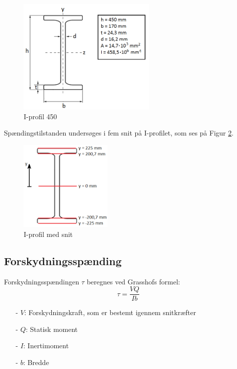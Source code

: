 \begin{figure}[H]
	\centering
	\includegraphics[width=0.6\textwidth]{billeder/iprofil.png}
	\caption{I-profil 450}
	\label{fig:iprofil}
\end{figure}

Spændingstilstanden undersøges i fem snit på I-profilet, som ses på Figur \ref{fig:iprofilsnit}.

\begin{figure}[H]
	\centering
	\includegraphics[width=0.4\textwidth]{billeder/iprofilsnit.png}
	\caption{I-profil med snit}
	\label{fig:iprofilsnit}
\end{figure}

\subsection{Forskydningsspænding}
Forskydningsspændingen $\tau$ beregnes ved Grasshofs formel:
\begin{equation}
\tau = \frac{VQ}{Ib}
\end{equation}
\begin{itemize}
	\item[-] $V$: Forskydningskraft, som er bestemt igennem snitkræfter
	\item[-] $Q$: Statisk moment
	\item[-] $I$: Inertimoment
	\item[-] $b$: Bredde
\end{itemize}

